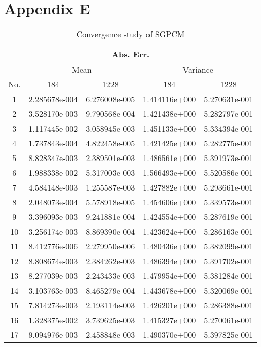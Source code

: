 \section*{Appendix E}
\begin{table}[!ht]
\begin{center}
\caption{Convergence study of SGPCM}\vspace{3mm} \label{conv}
\begin{tabular}{|c|c|c|c|c|}\hline
\multicolumn{5}{|c|}{Abs. Err.}\\\hline &\multicolumn{2}{|c|}{Mean}
& \multicolumn{2}{|c|}{ Variance}\\\hline No. & 184 &    1228     &
184 & 1228\\\hline 1 & 2.285678e-004&6.276008e-005
&1.414116e+000&5.270631e-001\\\hline 2 & 3.528170e-003&9.790568e-004
&1.421438e+000&5.282797e-001\\\hline 3 & 1.117445e-002&3.058945e-003
&1.451133e+000&5.334394e-001\\\hline 4 & 1.737843e-004&4.822458e-005
&1.421425e+000&5.282775e-001\\\hline 5 & 8.828347e-003&2.389501e-003
&1.486561e+000&5.391973e-001\\\hline 6 & 1.988338e-002&5.317003e-003
&1.566493e+000&5.520586e-001\\\hline 7 & 4.584148e-003&1.255587e-003
&1.427882e+000&5.293661e-001\\\hline 8 & 2.048073e-004&5.578918e-005
&1.454606e+000&5.339573e-001\\\hline 9 & 3.396093e-003&9.241881e-004
&1.424554e+000&5.287619e-001\\\hline 10 &
3.256174e-003&8.869390e-004 &1.423624e+000&5.286163e-001\\\hline 11
& 8.412776e-006&2.279950e-006 &1.480436e+000&5.382099e-001\\\hline
12 & 8.808674e-003&2.384262e-003
&1.486394e+000&5.391702e-001\\\hline 13 &
8.277039e-003&2.243433e-003 &1.479954e+000&5.381284e-001\\\hline 14
& 3.103763e-003&8.465279e-004 &1.443678e+000&5.320069e-001\\\hline
15 & 7.814273e-003&2.193114e-003
&1.426201e+000&5.286388e-001\\\hline 16 &
1.328375e-002&3.739625e-003 &1.415327e+000&5.270061e-001\\\hline 17
& 9.094976e-003&2.458848e-003 &1.490370e+000&5.397825e-001\\\hline

\end{tabular}
\end{center}
\end{table}
